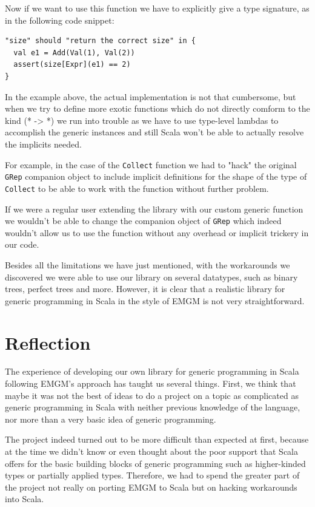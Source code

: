 \documentclass[a4paper]{article}
\newcommand{\scala}[1]{\lstinline[basicstyle=\ttfamily\color{white},style=scala]|#1|}
\begin{document}
Now if we want to use this function we have to explicitly give a type signature, as in the following code snippet:

\begin{lstlisting}[style=scala, frame=none]
"size" should "return the correct size" in {
  val e1 = Add(Val(1), Val(2))
  assert(size[Expr](e1) == 2)
}
\end{lstlisting}
In the example above, the actual implementation is not that cumbersome, but when we try to define more
exotic functions which do not directly comform to the kind (* -> *) we run into trouble as we have to use type-level lambdas to accomplish the generic instances and still Scala won't be able to actually resolve the implicits needed.

For example, in the case of the \lstinline[basicstyle=\ttfamily\color{white},style=scala]|Collect| function we had to "hack" the original \lstinline[basicstyle=\ttfamily\color{white},style=scala]|GRep| companion object to include implicit definitions for the shape of the type of \scala{Collect} to be able to work with the function without further problem.

If we were a regular user extending the library with our custom generic function we wouldn't be able to change the companion object of \scala{GRep} which indeed wouldn't allow us to use the function without any overhead or implicit trickery in our code.

Besides all the limitations we have just mentioned, with the workarounds we discovered we were able to use our library on several datatypes, such as binary trees, perfect trees and more. However, it is clear that a realistic library for generic programming in Scala in the style of EMGM is not very straightforward.

\section{Reflection}

The experience of developing our own library for generic programming in Scala following EMGM's approach has taught us several things. First, we think that maybe it was not the best of ideas to do a project on a topic as complicated as generic programming in Scala with neither previous knowledge of the language, nor more than a very basic idea of generic programming.

The project indeed turned out to be more difficult than expected at first, because at the time we didn't know or even thought about the poor support that Scala offers for the basic building blocks of generic programming such as higher-kinded types or partially applied types. Therefore, we had to spend the greater part of the project not really on porting EMGM to Scala but on hacking workarounds into Scala.
\end{document}
